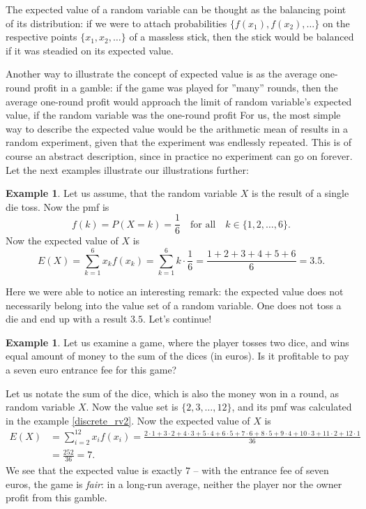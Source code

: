 \documentclass[12pt,a4paper,leqno]{report}
\theoremstyle{plain}
\theoremstyle{definition}
\newtheorem{esim}[equation]{Example}
\begin{document}
The expected value of a random variable can be thought as the balancing point of its distribution: if we were to attach probabilities $\{f(x_1), f(x_2), \dots\}$ on the respective points $\{x_1, x_2, \dots\}$ of a massless stick, then the stick would be balanced if it was steadied on its expected value.

Another way to illustrate the concept of expected value is as the average one-round profit in a gamble: if the game was played for ''many'' rounds, then the average one-round profit would approach the limit of random variable's expected value, if the random variable was the one-round profit  
For us, the most simple way to describe the expected value would be the arithmetic mean of results in a random experiment, given that the experiment was endlessly repeated. This is of course an abstract description, since in practice no experiment can go on forever. Let the next examples illustrate our illustrations further:

\begin{esim}
Let us assume, that the random variable $X$ is the result of a single die toss. Now the pmf is
\[
f(k) = P(X=k) = \frac{1}{6} \quad \text{for all} \quad k \in \{1,2, \dots ,6\}.
\]
Now the expected value of $X$ is
\[
E(X) = \sum_{k=1}^6 x_k f(x_k) = \sum_{k=1}^6 k \cdot \frac{1}{6} = \frac{1+2+3+4+5+6}{6} = 3.5.
\]
\end{esim}

Here we were able to notice an interesting remark: the expected value does not necessarily belong into the value set of a random variable. One does not toss a die and end up with a result $3.5$. Let's continue!

\begin{esim} 
Let us examine a game, where the player tosses two dice, and wins equal amount of money to the sum of the dices (in euros). Is it profitable to pay a seven euro entrance fee for this game?

Let us notate the sum of the dice, which is also the money won in a round, as random variable $X$. Now the value set is $\{2,3, \dots , 12\}$, and its pmf was calculated in the example \ref{discrete_rv2}. Now the expected value of $X$ is
\[
\begin{split}
E(X) &= \sum_{i=2}^{12}x_i f(x_i) = \frac{2 \cdot 1 + 3 \cdot 2 + 4 \cdot 3 + 5 \cdot 4 + 6 \cdot 5 + 7 \cdot 6 + 8 \cdot 5 + 9 \cdot 4 + 10 \cdot 3 + 11 \cdot 2 + 12 \cdot 1}{36} \\
 &= \frac{252}{36} = 7.
\end{split}
\]
We see that the expected value is exactly $7$ -- with the entrance fee of seven euros, the game is \emph{fair}: in a long-run average, neither the player nor the owner profit from this gamble.
\end{esim}
\end{document}
